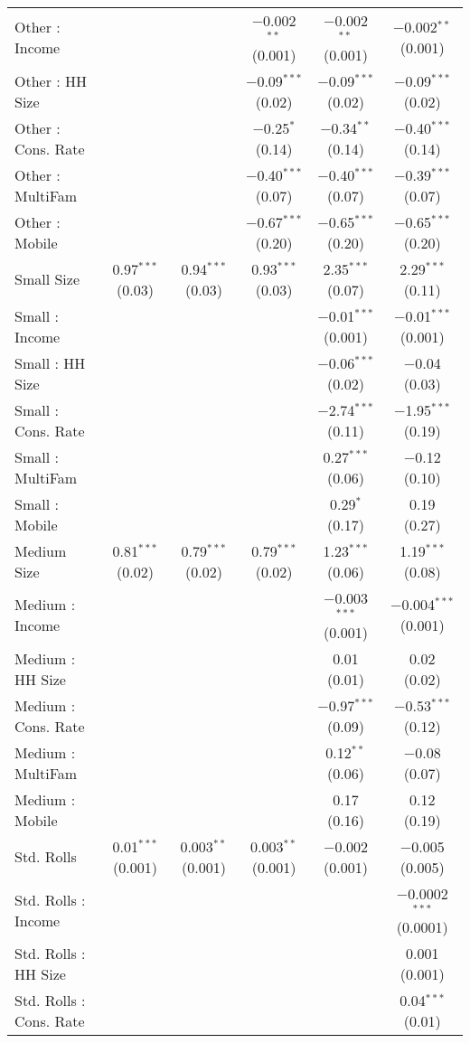 \begin{table}[!htbp]
\begin{tabular}{@{\extracolsep{5pt}}lccccc}
  Other : Income &  &  & $-$0.002$^{**}$ (0.001) & $-$0.002$^{**}$ (0.001) & $-$0.002$^{**}$ (0.001) \\ 
  Other : HH Size &  &  & $-$0.09$^{***}$ (0.02) & $-$0.09$^{***}$ (0.02) & $-$0.09$^{***}$ (0.02) \\ 
  Other : Cons. Rate &  &  & $-$0.25$^{*}$ (0.14) & $-$0.34$^{**}$ (0.14) & $-$0.40$^{***}$ (0.14) \\ 
  Other : MultiFam &  &  & $-$0.40$^{***}$ (0.07) & $-$0.40$^{***}$ (0.07) & $-$0.39$^{***}$ (0.07) \\ 
  Other : Mobile &  &  & $-$0.67$^{***}$ (0.20) & $-$0.65$^{***}$ (0.20) & $-$0.65$^{***}$ (0.20) \\ 
  Small Size & 0.97$^{***}$ (0.03) & 0.94$^{***}$ (0.03) & 0.93$^{***}$ (0.03) & 2.35$^{***}$ (0.07) & 2.29$^{***}$ (0.11) \\ 
  Small : Income &  &  &  & $-$0.01$^{***}$ (0.001) & $-$0.01$^{***}$ (0.001) \\ 
  Small : HH Size &  &  &  & $-$0.06$^{***}$ (0.02) & $-$0.04 (0.03) \\ 
  Small : Cons. Rate &  &  &  & $-$2.74$^{***}$ (0.11) & $-$1.95$^{***}$ (0.19) \\ 
  Small : MultiFam &  &  &  & 0.27$^{***}$ (0.06) & $-$0.12 (0.10) \\ 
  Small : Mobile &  &  &  & 0.29$^{*}$ (0.17) & 0.19 (0.27) \\ 
  Medium Size & 0.81$^{***}$ (0.02) & 0.79$^{***}$ (0.02) & 0.79$^{***}$ (0.02) & 1.23$^{***}$ (0.06) & 1.19$^{***}$ (0.08) \\ 
  Medium : Income &  &  &  & $-$0.003$^{***}$ (0.001) & $-$0.004$^{***}$ (0.001) \\ 
  Medium : HH Size &  &  &  & 0.01 (0.01) & 0.02 (0.02) \\ 
  Medium : Cons. Rate &  &  &  & $-$0.97$^{***}$ (0.09) & $-$0.53$^{***}$ (0.12) \\ 
  Medium : MultiFam &  &  &  & 0.12$^{**}$ (0.06) & $-$0.08 (0.07) \\ 
  Medium : Mobile &  &  &  & 0.17 (0.16) & 0.12 (0.19) \\ 
  Std. Rolls & 0.01$^{***}$ (0.001) & 0.003$^{**}$ (0.001) & 0.003$^{**}$ (0.001) & $-$0.002 (0.001) & $-$0.005 (0.005) \\ 
  Std. Rolls : Income &  &  &  &  & $-$0.0002$^{***}$ (0.0001) \\ 
  Std. Rolls : HH Size &  &  &  &  & 0.001 (0.001) \\ 
  Std. Rolls : Cons. Rate &  &  &  &  & 0.04$^{***}$ (0.01) \\ 

\end{tabular}
\end{table}
